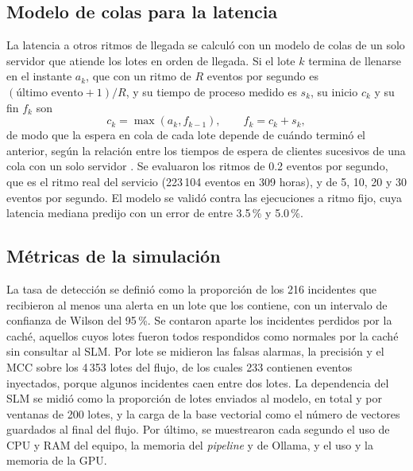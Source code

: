 \subsection{Modelo de colas para la latencia}

La latencia a otros ritmos de llegada se calculó con un modelo de colas de un solo servidor que atiende los lotes en orden de llegada. Si el lote $k$ termina de llenarse en el instante $a_k$, que con un ritmo de $R$ eventos por segundo es $(\text{último evento} + 1)/R$, y su tiempo de proceso medido es $s_k$, su inicio $c_k$ y su fin $f_k$ son
\begin{equation}
c_k = \max(a_k, f_{k-1}), \qquad f_k = c_k + s_k,
\end{equation}
de modo que la espera en cola de cada lote depende de cuándo terminó el anterior, según la relación entre los tiempos de espera de clientes sucesivos de una cola con un solo servidor \cite{lindley1952_queues}. Se evaluaron los ritmos de 0.2 eventos por segundo, que es el ritmo real del servicio (223\,104 eventos en 309 horas), y de 5, 10, 20 y 30 eventos por segundo. El modelo se validó contra las ejecuciones a ritmo fijo, cuya latencia mediana predijo con un error de entre 3.5\,\% y 5.0\,\%.

\subsection{Métricas de la simulación}

La tasa de detección se definió como la proporción de los 216 incidentes que recibieron al menos una alerta en un lote que los contiene, con un intervalo de confianza de Wilson del 95\,\%. Se contaron aparte los incidentes perdidos por la caché, aquellos cuyos lotes fueron todos respondidos como normales por la caché sin consultar al SLM. Por lote se midieron las falsas alarmas, la precisión y el MCC sobre los 4\,353 lotes del flujo, de los cuales 233 contienen eventos inyectados, porque algunos incidentes caen entre dos lotes. La dependencia del SLM se midió como la proporción de lotes enviados al modelo, en total y por ventanas de 200 lotes, y la carga de la base vectorial como el número de vectores guardados al final del flujo. Por último, se muestrearon cada segundo el uso de CPU y RAM del equipo, la memoria del \textit{pipeline} y de Ollama, y el uso y la memoria de la GPU.

